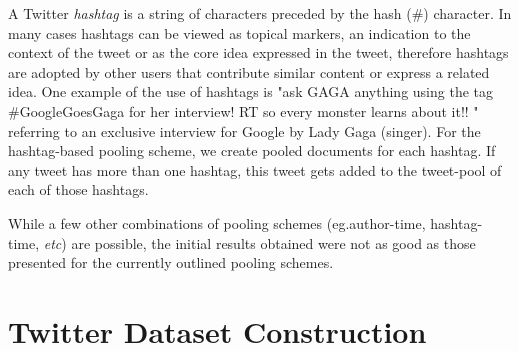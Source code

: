 \documentclass{sig-alternate}
\begin{document}
\vspace{1mm} A Twitter \textit{hashtag} is a
string of characters preceded by the hash (\#) character. In many
cases hashtags can be viewed as topical markers, an indication to the
context of the tweet or as the core idea expressed in the tweet,
therefore hashtags are adopted by other users that contribute similar
content or express a related idea. One example of the use of hashtags
is "ask GAGA anything using the tag \#GoogleGoesGaga for her
interview! RT so every monster learns about it!! " referring to an
exclusive interview for Google by Lady Gaga (singer).
For the hashtag-based pooling scheme, we create pooled documents
for each hashtag. If any tweet has more than one hashtag, this tweet
gets added to the tweet-pool of each of those hashtags.

\vspace{1mm} While a few other combinations of
pooling schemes (eg.author-time, hashtag-time, \textit{etc}) are
possible, the initial results obtained were not as good as those
presented for the currently outlined pooling schemes.  


\section{Twitter Dataset Construction}

\label{sec:dataset}

\end{document}
